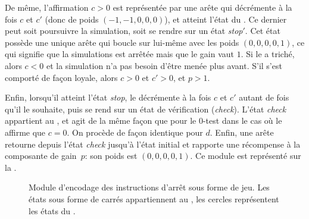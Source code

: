 De même, l'affirmation $c>0$ est représentée par une arête qui décrémente à la fois $c$ et $c'$ (donc de poids $(-1,-1,0,0,0)$), et atteint l'état du \ji.
Ce dernier peut soit poursuivre la simulation, soit se rendre sur un état \emph{stop$'$}.
Cet état possède une unique arête qui boucle sur lui-même avec les poids $(0,0,0,0,1)$, ce qui signifie que la simulations est arrêtée mais que le gain vaut $1$.
Si le \jo a triché, alors $c<0$ et la simulation n'a pas besoin d'être menée plus avant.
S'il s'est comporté de façon loyale, alors $c>0$ et $c'>0$, et $p>1$.

Enfin, lorsqu'il atteint l'état \emph{stop}, le \jo décrémente à la fois $c$ et $c'$ autant de fois qu'il le souhaite, puis se rend sur un état de vérification (\emph{check}).
L'état \emph{check} appartient au \ji, et agit de la même façon que pour le $0$-test dans le cas où le \jo affirme que $c=0$.
On procède de façon identique pour $d$.
Enfin, une arête retourne depuis l'état \emph{check} jusqu'à l'état initial et rapporte une récompense à la composante de gain~$p$: son poids est $(0,0,0,0,1)$.
Ce module est représenté sur la .

\begin{figure}[ht]
\centering
{}
\caption[Module d'encodage des instructions d'arrêt sous forme de jeu.]{Module d'encodage des instructions d'arrêt sous forme de jeu. Les états sous forme de carrés appartiennent au \jo, les cercles représentent les états du \ji.}%
\label{tj:fig:halt}
\end{figure}

